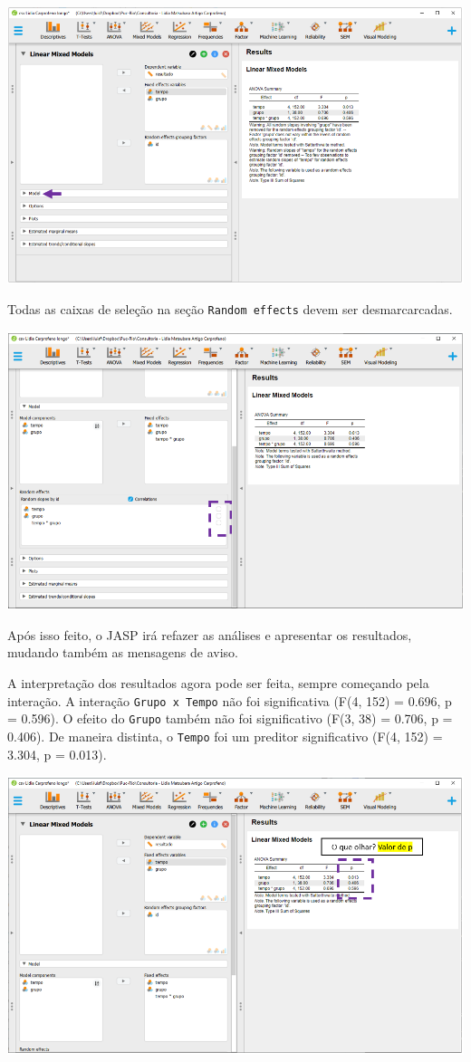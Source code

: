 \documentclass[
]{book}
\begin{document}
\includegraphics{./img/cap_lmm_model.png}

Todas as caixas de seleção na seção \texttt{Random\ effects} devem ser
desmarcarcadas.

\includegraphics{./img/cap_lmm_model2.png}

Após isso feito, o JASP irá refazer as análises e apresentar os
resultados, mudando também as mensagens de aviso.

A interpretação dos resultados agora pode ser feita, sempre começando
pela interação. A interação \texttt{Grupo\ x\ Tempo} não foi
significativa (F(4, 152) = 0.696, p = 0.596). O efeito do \texttt{Grupo}
também não foi significativo (F(3, 38) = 0.706, p = 0.406). De maneira
distinta, o \texttt{Tempo} foi um preditor significativo (F(4, 152) =
3.304, p = 0.013).

\includegraphics{./img/cap_lmm_resultados.png}
\end{document}
